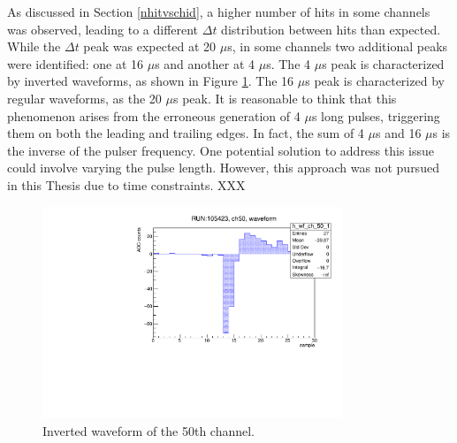 As discussed in Section \ref{nhitvschid}, a higher number of hits in some channels was observed, 
leading to a different $\Delta t$ distribution between hits than expected. 
While the $\Delta t$ peak was expected at 20 $\mu$s, in some channels two additional peaks were identified: 
one at 16 $\mu$s and another at 4 $\mu$s. The 4 $\mu$s peak is characterized by inverted waveforms, as shown in Figure \ref{fig:inverted}. 
The 16 $\mu$s peak is characterized by regular waveforms, as the 20 $\mu$s peak.
It is reasonable to think that this phenomenon arises from the erroneous generation of 4 $\mu$s long pulses, 
triggering them on both the leading and trailing edges. In fact, the sum of 4 $\mu$s and 16 $\mu$s is the inverse of the pulser frequency. 
One potential solution to address this issue could involve varying the pulse length. 
However, this approach was not pursued in this Thesis due to time constraints.
XXX
\begin{figure}[!h]
  \centering
  \includegraphics[width=0.8\textwidth]{figures/pdf/wf_ch50_1.pdf}
  \caption{Inverted waveform of the 50th channel.}
 \label{fig:inverted}
\end{figure}
